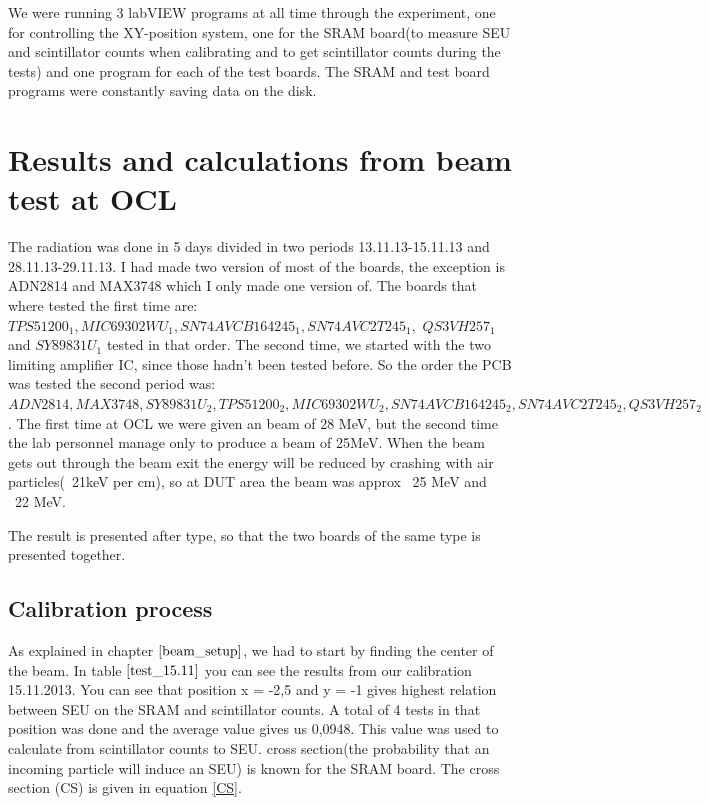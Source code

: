 \documentclass[12pt]{article}
\numberwithin{figure}{section}
\begin{document}
We were running 3 labVIEW programs at all time through the experiment, one for controlling the XY-position system,
one for the \ac{SRAM} board(to measure SEU and scintillator counts when calibrating and to get scintillator counts during the tests) and one program for each of the test boards.
The \ac{SRAM} and test board programs were constantly saving data on the disk.

\newpage

\section{Results and calculations from beam test at OCL}
The radiation was done in 5 days divided in two periods 13.11.13-15.11.13 and 28.11.13-29.11.13. I had made two version of most of the boards, the exception is ADN2814 and MAX3748 which I only made one version of.
The boards that where tested the first time are: $TPS51200_1, MIC69302WU_1, SN74AVCB164245_1, SN74AVC2T245_1,$
$QS3VH257_1$ and $SY89831U_1$ tested in that order. The second time, we started with the two limiting amplifier \ac{IC}, since those hadn't been tested before. So the order the \ac{PCB} was tested the second period was: $ADN2814, MAX3748, SY89831U_2, TPS51200_2, MIC69302WU_2, SN74AVCB164245_2, SN74AVC2T245_2, QS3VH257_2$.
The first time at \ac{OCL} we were given an beam of 28 MeV, but the second time the lab personnel manage only to produce a beam of 25MeV.
When the beam gets out through the beam exit the energy will be reduced by crashing with air particles(~21keV per cm), so at DUT area the beam was approx ~25 MeV and ~22 MeV.

The result is presented after type, so that the two boards of the same type is presented together. 

\subsection{Calibration process}
As explained in chapter $\ref{beam_setup}$, we had to start by finding the center of the beam. In table $\ref{test_15.11}$ you can see the results from our calibration 15.11.2013. You can see that position x = -2,5 and y = -1 gives highest relation between SEU on the \ac{SRAM} and scintillator counts. A total of 4 tests in that position was done and the average value gives us 0,0948.
This value was used to calculate from scintillator counts to \ac{SEU}. cross section(the probability that an incoming particle will induce an SEU) is known for the \ac{SRAM} board. The cross section (CS) is given in equation \ref{CS}.
\end{document}
